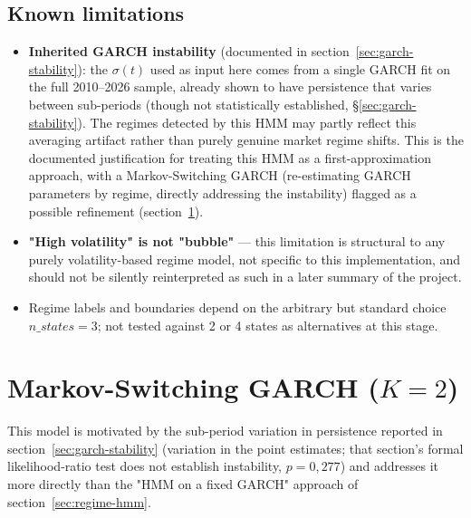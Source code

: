 \documentclass[12pt,a4paper]{article}
\begin{document}
\newpage

\subsection{Known limitations}

\begin{limitbox}
	\begin{itemize}
		\item \textbf{Inherited GARCH instability} (documented in
		section~\ref{sec:garch-stability}): the $\sigma(t)$ used as
		input here comes from a single GARCH fit on the full
		2010--2026 sample, already shown to have persistence
		that varies between sub-periods (though not statistically
		established, \S\ref{sec:garch-stability}). The regimes
		detected by this HMM may partly reflect this
		averaging artifact rather than purely genuine market regime
		shifts. This is the documented justification for treating this HMM as a
		first-approximation approach, with a Markov-Switching
		GARCH (re-estimating GARCH parameters by regime, directly
		addressing the instability) flagged as a possible refinement
		(section~\ref{sec:msgarch}).
		\item \textbf{"High volatility" is not "bubble"}
		--- this limitation is structural to any purely
		volatility-based regime model, not specific to this
		implementation, and should not be silently reinterpreted
		as such in a later summary of the project.
		\item Regime labels and boundaries depend on the arbitrary but
		standard choice $n\_states=3$; not tested against 2 or 4
		states as alternatives at this stage.
	\end{itemize}
\end{limitbox}

\newpage

\section{Markov-Switching GARCH ($K=2$)}
\label{sec:msgarch}

This model is motivated by the sub-period variation in
persistence reported in section~\ref{sec:garch-stability} (variation in the
point estimates; that section's formal likelihood-ratio test does
not establish instability, $p=0{,}277$) and addresses it
more directly than the "HMM on a fixed GARCH" approach of
section~\ref{sec:regime-hmm}.
\end{document}

